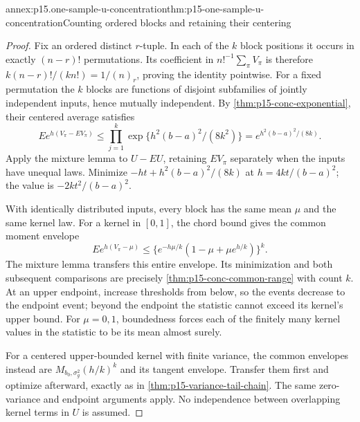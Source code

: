 \begin{annexitem}{annex:p15.one-sample-u-concentration}{thm:p15-one-sample-u-concentration}{Counting ordered blocks and retaining their centering}
\begin{proof}
Fix an ordered distinct \(r\)-tuple. In each of the \(k\) block positions
it occurs in exactly \((n-r)!\) permutations.
Its coefficient in \(n!^{-1}\sum_\pi V_\pi\) is therefore
\(k(n-r)!/(kn!)=1/(n)_r\), proving the identity pointwise.
For a fixed permutation the \(k\) blocks are functions of disjoint
subfamilies of jointly independent inputs, hence mutually independent.
By \cref{thm:p15-conc-exponential}, their centered average satisfies
\[
 E e^{h(V_\pi-EV_\pi)}
 \leq\prod_{j=1}^k
       \exp\{h^2(b-a)^2/(8k^2)\}
 =e^{h^2(b-a)^2/(8k)}.
\]
Apply the mixture lemma to \(U-EU\), retaining \(EV_\pi\) separately
when the inputs have unequal laws. Minimize
\(-ht+h^2(b-a)^2/(8k)\) at \(h=4kt/(b-a)^2\); the value is
\(-2kt^2/(b-a)^2\).

With identically distributed inputs, every block has the same mean
\(\mu\) and the same kernel law. For a kernel in \([0,1]\), the chord
bound gives the common moment envelope
\[
 E e^{h(V_\pi-\mu)}
 \leq\{e^{-h\mu/k}(1-\mu+\mu e^{h/k})\}^{k}.
\]
The mixture lemma transfers this entire envelope. Its minimization
and both subsequent comparisons are precisely
\cref{thm:p15-conc-common-range} with count \(k\).
At an upper endpoint, increase thresholds from below, so the events
decrease to the endpoint event; beyond
the endpoint the statistic cannot exceed its kernel's upper bound.
For \(\mu=0,1\), boundedness forces each of the finitely many kernel
values in the statistic to be its mean almost surely.

For a centered upper-bounded kernel with finite variance, the common
envelopes instead are \(M_{b_0,\sigma_g^2}(h/k)^k\) and its tangent
envelope. Transfer them first and optimize afterward, exactly as in
\cref{thm:p15-variance-tail-chain}. The same zero-variance and
endpoint arguments apply. No independence between overlapping
kernel terms in \(U\) is assumed.
\end{proof}
\end{annexitem}

